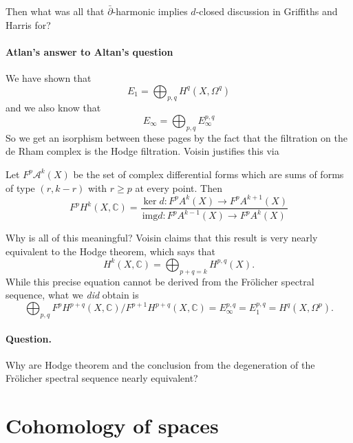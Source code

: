 \begin{remark}[Dani]
\label{remark-dani}
	Then what was all that
	$\bar\partial$-harmonic implies $d$-closed
	discussion in Griffiths and Harris for?
\end{remark}

\paragraph{Atlan's answer to Altan's
question} We have shown that
$$E_1=\bigoplus_{p,q} H^{q}(X,\Omega^q)$$
and we also know that
$$E_\infty=\bigoplus_{p,q} E_\infty^{p,q} $$
So we get an isorphism between these pages by
the fact that the filtration on the de Rham
complex is the Hodge filtration. Voisin
justifies this via
\begin{proposition}[Voisin, 7.5]
\label{proposition-voisin-7-5}
Let $F^p\mathcal{A}^k(X)$ be the set of
complex differential forms which are sums of
forms of type $(r,k-r)$ with $r\geq p$ at
every point. Then
$$F^pH^{k}(X,\mathbb{C})=\dfrac{\ker
d:F^pA^k(X)\to F^pA^{k+1}(X) }{\text{img
}d:F^pA^{k-1}(X)\to F^pA^k(X)}$$
\end{proposition}

\begin{remark}
\label{remark-why-all-meani-voisi-claim}
	Why is all of this meaningful? Voisin claims
	that this result is very nearly
	equivalent to the Hodge theorem, which says
	that
\begin{equation*}\label{eq:hodge-decom}
	 H^{k}(X,\mathbb{C})=\bigoplus_{p+q=k}
	 H^{p,q}(X).
\end{equation*}
While this precise equation cannot be derived
from the Fr\"olicher spectral sequence, what
we \textit{did} obtain is
$$\bigoplus_{p,q}F^pH^{p+q}(X,\mathbb{C})/
F^{p+1}H^{p+q}(X,\mathbb{C})=E^{p,q}_{\infty}
=E^{p,q}_{1}=H^q(X,\Omega^p).$$

\paragraph{Question.}
Why are Hodge theorem and the conclusion from
the degeneration of the Fr\"olicher spectral
sequence nearly equivalent?
\end{remark}





\section{Cohomology of spaces}
\label{at-section-cohomology-spaces}

